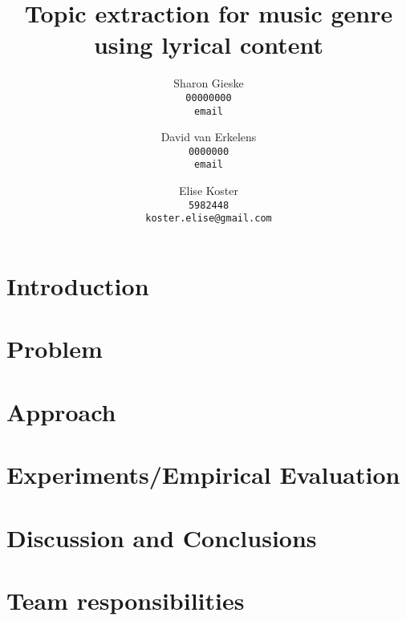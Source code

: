 \documentclass{article} %
\title{Topic extraction for music genre using lyrical content}
\author{
Sharon Gieske \\
\texttt{00000000}\\
\texttt{email} \\
\and
David van Erkelens\\
\texttt{0000000}\\
\texttt{email} \\
\and
Elise Koster \\
\texttt{5982448}\\
\texttt{koster.elise@gmail.com}
}
\begin{document}
\maketitle

\begin{abstract}

\end{abstract}

\section{Introduction}


\section{Problem}


\section{Approach}


\section{Experiments/Empirical Evaluation}


\section{Discussion and Conclusions}


\section{Team responsibilities}

\end{document}
